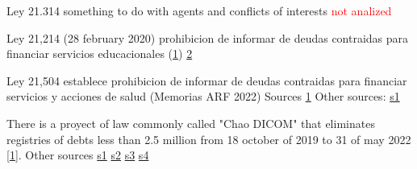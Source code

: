 \documentclass[12pt]{article}
\theoremstyle{plain}
\theoremstyle{plain}
\theoremstyle{definition}  %
\theoremstyle{remark}  %
\begin{document}
Ley 21.314 something to do with agents and conflicts of interests \textcolor{red}{not analized}

Ley 21,214 (28 february 2020) prohibicion de informar de deudas contraidas para financiar servicios educacionales (\href{https://www.aguilaycia.cl/post/ley-chao-dicom-en-chile-un-an%C3%A1lisis-exhaustivo}{1})
\href{https://www.cnnchile.com/pais/senado-chao-dicom-deudas-estudiantiles_20190515/}{2}


Ley 21,504 establece prohibicion de informar de deudas contraidas para financiar servicios y acciones de salud (Memorias ARF 2022) 
Sources \href{https://www.diarioconcepcion.cl/pais/2023/05/12/por-ley-no-se-puede-informar-deudas-de-salud-en-dicom.html}{1}
Other sources: 
\href{https://www.gonzalezronycia.cl/2020/03/03/ley-n21-214-denominada-chao-dicom-que-prohibe-que-se-informe-sobre-deudas-contraidas-para-financiar-la-educacion/}{s1}
 


There is a proyect of law commonly called "Chao DICOM" that eliminates registries of debts less than 2.5 million from 18 october of 2019 to 31 of may 2022 [\href{https://www.biobiochile.cl/noticias/nacional/chile/2022/08/03/camara-despacha-proyecto-de-ley-chao-dicom-vamos-a-darle-una-segunda-oportunidad-a-las-personas.shtml}{1}]. Other sources 
\href{https://www.chilevision.cl/noticias/te-ayuda/video/chao-dicom-en-que-consiste-el-proyecto-y-a-quienes-beneficiaria}{s1}
\href{https://www.mosabogados.cl/ley-chao-dicom/URL}{s2}
\href{https://www.votovisible.cl/proyectos/14888-03}{s3}
\href{https://www.diariousach.cl/chao-dicom-camara-baja-aprueba-proyecto-y-pasa-al-senado}{s4}

 
 
\printbibliography
\end{document}
